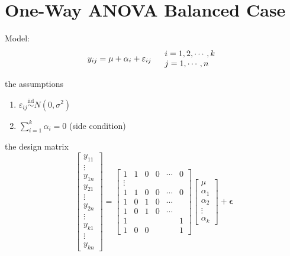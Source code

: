 \documentclass{article}
\begin{document}
\section{One-Way ANOVA Balanced Case}

Model:%
\begin{equation*}
y_{ij}=\mu +\alpha _{i}+\varepsilon _{ij}\quad 
\begin{tabular}{l}
$i=1,2,\cdots ,k$ \\ 
$j=1,\cdots ,n$%
\end{tabular}%
\end{equation*}

the assumptions

\begin{enumerate}
\item $\varepsilon _{ij}\overset{\text{iid}}{\sim }N\left( 0,\sigma
^{2}\right) $

\item $\sum\limits_{i=1}^{k}\alpha _{i}=0$ (side condition)
\end{enumerate}

\bigskip

the design matrix%
\begin{equation*}
\left[ 
\begin{array}{c}
y_{11} \\ 
\vdots \\ 
y_{1n} \\ 
y_{21} \\ 
\vdots \\ 
y_{2n} \\ 
\vdots \\ 
y_{k1} \\ 
\vdots \\ 
y_{kn}%
\end{array}%
\right] =\left[ 
\begin{array}{cccccc}
1 & 1 & 0 & 0 & \cdots & 0 \\ 
\vdots &  &  &  &  &  \\ 
1 & 1 & 0 & 0 & \cdots & 0 \\ 
1 & 0 & 1 & 0 & \cdots &  \\ 
1 & 0 & 1 & 0 & \cdots &  \\ 
1 &  &  &  &  & 1 \\ 
1 & 0 & 0 &  &  & 1%
\end{array}%
\right] \left[ 
\begin{array}{c}
\mu \\ 
\alpha _{1} \\ 
\alpha _{2} \\ 
\vdots \\ 
\alpha _{k}%
\end{array}%
\right] +\mathbf{\epsilon }
\end{equation*}
\end{document}
